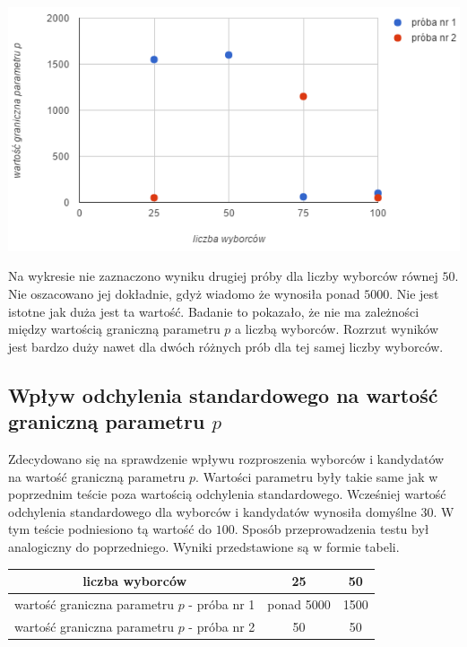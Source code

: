 \documentclass[pdflatex,11pt]{../aghdoc_version2}
\begin{document}
\vspace{\baselineskip}

\begin{center}
\centerline{\includegraphics[scale=1]{pics/wartosc_graniczna_od_liczba_wyborcow.png}}
\end{center}

Na wykresie nie zaznaczono wyniku drugiej próby dla liczby wyborców równej $50$. Nie oszacowano jej dokładnie, gdyż wiadomo że wynosiła ponad $5000$. Nie jest istotne jak duża jest ta wartość. Badanie to pokazało, że nie ma zależności między wartością graniczną parametru $p$ a liczbą wyborców. Rozrzut wyników jest bardzo duży nawet dla dwóch różnych prób dla tej samej liczby wyborców.   

\subsection{Wpływ odchylenia standardowego na wartość graniczną parametru $p$}
Zdecydowano się na sprawdzenie wpływu rozproszenia wyborców i kandydatów na wartość graniczną parametru $p$. Wartości parametru były takie same jak w poprzednim teście poza wartością odchylenia standardowego. Wcześniej wartość odchylenia standardowego dla wyborców i kandydatów wynosiła domyślne $30$. W tym teście podniesiono tą wartość do $100$. Sposób przeprowadzenia testu był analogiczny do poprzedniego. Wyniki przedstawione są w formie tabeli.

\begin{center}
\begin{tabular}{|c|c|c|}
   \hline 
   liczba wyborców & 25 & 50 \\ 
   \hline 
   wartość graniczna parametru $p$ - próba nr 1 & ponad 5000 & 1500 \\ 
   \hline 
   wartość graniczna parametru $p$ - próba nr 2 & 50 & 50 \\ 
   \hline 
\end{tabular}    
\end{center}
\end{document}
